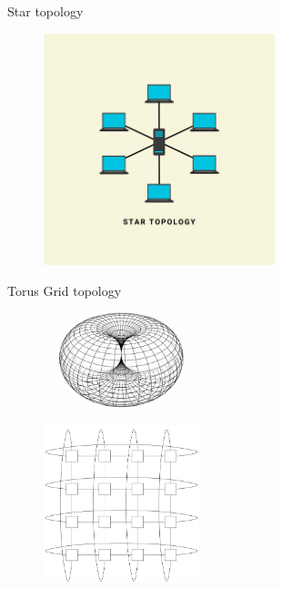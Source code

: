 \documentclass{beamer}
\begin{document}
\begin{frame}{Star topology}
  \begin{figure}[h]
    \includegraphics[width=0.6\textwidth]{images/star-topology.jpg}
  \end{figure}
\end{frame}

\begin{frame}{Torus Grid topology}
  \begin{figure}[h]
    \includegraphics[width=0.4\textwidth]{images/torus.jpeg}
  \end{figure}
  \begin{figure}[h]
    \includegraphics[width=0.4\textwidth]{images/torus-topology.png}
  \end{figure}
\end{frame}
\end{document}
